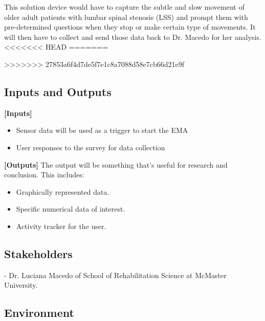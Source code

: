 \documentclass[12pt]{article}
\begin{document}
This solution device would have to capture the subtle and slow movement of older adult patients with lumbar spinal stenosis (LSS) and prompt them with pre-determined questions when they stop or make certain type of  movements. It will then have to collect and send those data back to Dr. Macedo for her analysis.
<<<<<<< HEAD
=======

\pagebreak
>>>>>>> 27853a6f4d7de5f7e1c8a7088d58e7cb66d21e9f

\subsection{Inputs and Outputs}

\textbf{[Inputs]}
\begin{itemize}
    \item Sensor data will be used as a trigger to start the EMA
    \item User responses to the survey for data collection
\end{itemize}

\textbf{[Outputs]}
\linebreak
The output will be something that's useful for research and conclusion. This includes:
\begin{itemize}
    \item Graphically represented data.
    \item Specific numerical data of interest.
    \item Activity tracker for the user.
\end{itemize}

\subsection{Stakeholders}

- Dr. Luciana Macedo of School of Rehabilitation Science at McMaster University.

\subsection{Environment}
\end{document}

